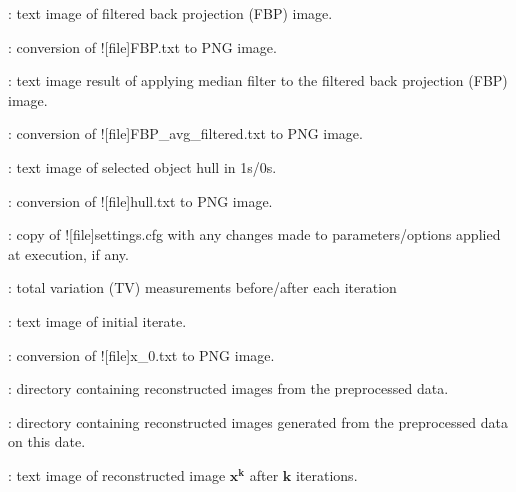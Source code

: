 \begin{tcbenvironment}
\begin{tcbenumbox}
\begin{ThinEnum}
\begin{ThinEnum}
\begin{ThinEnum}
\begin{ThinEnum}
\begin{ThinEnum}
\begin{ThinEnum}
\begin{ThinEnum}
\begin{ThinEnum}
\begin{ThinEnum}
                                            \item {} : text image of filtered back projection (FBP) image.
                                            \item {} : conversion of \docentry![file]{FBP.txt} to PNG image.
                                            \item {} : text image result of applying median filter to the filtered back projection (FBP) image.
                                            \item {} : conversion of \docentry![file]{FBP\_avg\_filtered.txt} to PNG image.
                                            \item {} : text image of selected object hull in 1s/0s.
                                            \item {} : conversion of \docentry![file]{hull.txt} to PNG image.
                                            \item {} : copy of \docentry![file]{settings.cfg} with any changes made to parameters/options applied at execution, if any.
                                            \item {} : total variation (TV) measurements before/after each iteration
                                            \item {} : text image of initial iterate.
                                            \item {} : conversion of \docentry![file]{x\_0.txt} to PNG image.
                                        \item {} : directory containing reconstructed images from the preprocessed data.
                                        \begin{ThinEnum}
                                            \item {} : directory containing reconstructed images generated from the preprocessed data on this date.
                                                \begin{ThinEnum}
                                                    \item {} : text image of reconstructed image $\boldsymbol{x^k}$ after $\boldsymbol{k}$ iterations.

\end{ThinEnum}
\end{ThinEnum}
\end{ThinEnum}
\end{ThinEnum}
\end{ThinEnum}
\end{ThinEnum}
\end{ThinEnum}
\end{ThinEnum}
\end{ThinEnum}
\end{ThinEnum}
\end{ThinEnum}
\end{tcbenumbox}
\end{tcbenvironment}
